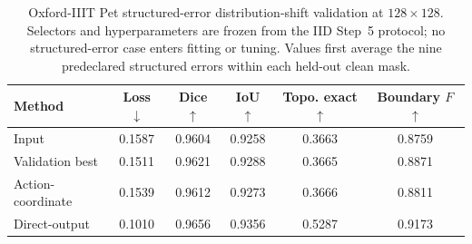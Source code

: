 \begin{table}[t]
\centering
\caption{Oxford-IIIT Pet structured-error distribution-shift validation at $128\times128$. Selectors and hyperparameters are frozen from the IID Step~5 protocol; no structured-error case enters fitting or tuning. Values first average the nine predeclared structured errors within each held-out clean mask.}
\label{tab:structured_step7}
\scriptsize
\setlength{\tabcolsep}{3pt}
\begin{tabular}{lccccc}
\toprule
Method & Loss $\downarrow$ & Dice $\uparrow$ & IoU $\uparrow$ & Topo. exact $\uparrow$ & Boundary $F$ $\uparrow$\\
\midrule
Input & 0.1587 & 0.9604 & 0.9258 & 0.3663 & 0.8759\\
Validation best & 0.1511 & 0.9621 & 0.9288 & 0.3665 & 0.8871\\
Action-coordinate & 0.1539 & 0.9612 & 0.9273 & 0.3666 & 0.8811\\
Direct-output & 0.1010 & 0.9656 & 0.9356 & 0.5287 & 0.9173\\
\bottomrule
\end{tabular}
\end{table}
